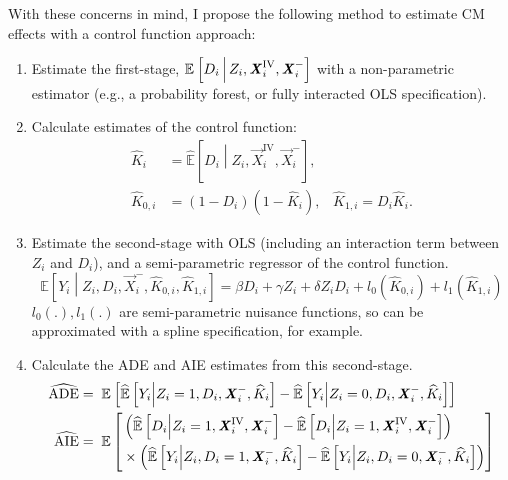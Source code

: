 With these concerns in mind, I propose the following method to estimate CM effects with a control function approach:
\begin{enumerate}
    \item Estimate the first-stage, $\mathbb{E}_{} \left[ D_i \, \middle\vert \, Z_i, \boldsymbol{\mathit{X}}_i^{\text{IV}}, \boldsymbol{\mathit{X}}_i^- \right]$ with a non-parametric estimator (e.g., a probability forest, or fully interacted OLS specification).
    \item Calculate estimates of the control function:
    \begin{align*}
        \hat K_i &= \hat{\mathbb E} \left[D_i \middle\vert Z_i, \vec X_i^{\text{IV}}, \vec X_i^- \right], \\
        \hat K_{0,i} &= (1 - D_i) (1 - \hat K_i), \;\;\;
            \hat K_{1,i} = D_i \hat K_i.
    \end{align*}
    \item Estimate the second-stage with OLS (including an interaction term between $Z_i$ and $D_i$), and a semi-parametric regressor of the control function.
    \[ \mathbb{E} \left[Y_i \middle\vert Z_i, D_i, \vec X_i^-, \hat K_{0,i}, \hat K_{1,i}\right]
    = \beta D_i + \gamma Z_i + \delta Z_i D_i + l_0\left( \hat K_{0,i}\right) + l_1 \left( \hat K_{1,i} \right) \]
    $l_0(.), l_1(.)$ are semi-parametric nuisance functions, so can be approximated with a spline specification, for example.
    \item Calculate the ADE and AIE estimates from this second-stage.
    \begin{align*}
        \widehat{\text{ADE}} &= \; \mathbb{E}_{} \left[ 
            \widehat{\mathbb{E}} \left[ Y_i \middle\vert Z_i = 1, D_i, \boldsymbol{\mathit{X}}_i^-, \widehat{K}_i \right]
            - \widehat{\mathbb{E}} \left[ Y_i \middle\vert Z_i = 0, D_i, \boldsymbol{\mathit{X}}_i^-, \widehat{K}_i \right] \right] \\
        \widehat{\text{AIE}} &= \; \mathbb E \left[ \begin{aligned} &\left(
            \widehat{\mathbb{E}} \left[D_i \middle\vert Z_i = 1, \boldsymbol{\mathit{X}}_i^{\text{IV}}, \boldsymbol{\mathit{X}}_i^-\right]
            - \widehat{\mathbb{E}} \left[D_i \middle\vert Z_i = 1, \boldsymbol{\mathit{X}}_i^{\text{IV}}, \boldsymbol{\mathit{X}}_i^-\right] \right) \\
            &\times \left(
                \widehat{\mathbb{E}} \left[ Y_i \middle\vert Z_i, D_i = 1, \boldsymbol{\mathit{X}}_i^-, \widehat{K}_i \right]
            - \widehat{\mathbb{E}} \left[ Y_i \middle\vert Z_i, D_i = 0, \boldsymbol{\mathit{X}}_i^-, \widehat{K}_i \right]
            \right) \end{aligned} \right]
    \end{align*}

\end{enumerate}
